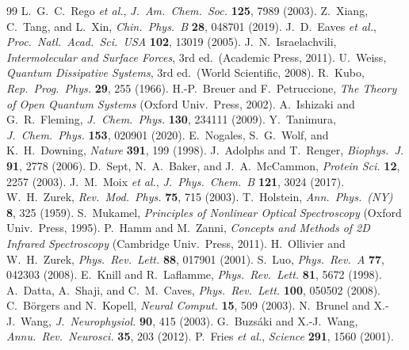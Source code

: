 \documentclass[twocolumn,10pt]{article}
\begin{document}
\begin{thebibliography}{99}
 L.~G.~C.~Rego \textit{et al.},
\textit{J.\ Am.\ Chem.\ Soc.} \textbf{125}, 7989 (2003).
 Z.~Xiang, C.~Tang, and L.~Xin,
\textit{Chin.\ Phys.\ B} \textbf{28}, 048701 (2019).
 J.~D.~Eaves \textit{et al.},
\textit{Proc.\ Natl.\ Acad.\ Sci.\ USA} \textbf{102}, 13019 (2005).
 J.~N.~Israelachvili, \textit{Intermolecular and
Surface Forces}, 3rd ed.\ (Academic Press, 2011).
 U.~Weiss, \textit{Quantum Dissipative Systems},
3rd ed.\ (World Scientific, 2008).
 R.~Kubo,
\textit{Rep.\ Prog.\ Phys.} \textbf{29}, 255 (1966).
 H.-P.~Breuer and F.~Petruccione,
\textit{The Theory of Open Quantum Systems} (Oxford Univ.\ Press, 2002).
 A.~Ishizaki and G.~R.~Fleming,
\textit{J.\ Chem.\ Phys.} \textbf{130}, 234111 (2009).
 Y.~Tanimura,
\textit{J.\ Chem.\ Phys.} \textbf{153}, 020901 (2020).
 E.~Nogales, S.~G.~Wolf, and K.~H.~Downing,
\textit{Nature} \textbf{391}, 199 (1998).
 J.~Adolphs and T.~Renger,
\textit{Biophys.\ J.} \textbf{91}, 2778 (2006).
 D.~Sept, N.~A.~Baker, and J.~A.~McCammon,
\textit{Protein Sci.} \textbf{12}, 2257 (2003).
 J.~M.~Moix \textit{et al.},
\textit{J.\ Phys.\ Chem.\ B} \textbf{121}, 3024 (2017).
 W.~H.~Zurek,
\textit{Rev.\ Mod.\ Phys.} \textbf{75}, 715 (2003).
 T.~Holstein,
\textit{Ann.\ Phys.\ (NY)} \textbf{8}, 325 (1959).
 S.~Mukamel, \textit{Principles of Nonlinear Optical
Spectroscopy} (Oxford Univ.\ Press, 1995).
 P.~Hamm and M.~Zanni, \textit{Concepts and Methods of
2D Infrared Spectroscopy} (Cambridge Univ.\ Press, 2011).
 H.~Ollivier and W.~H.~Zurek,
\textit{Phys.\ Rev.\ Lett.} \textbf{88}, 017901 (2001).
 S.~Luo,
\textit{Phys.\ Rev.\ A} \textbf{77}, 042303 (2008).
 E.~Knill and R.~Laflamme,
\textit{Phys.\ Rev.\ Lett.} \textbf{81}, 5672 (1998).
 A.~Datta, A.~Shaji, and C.~M.~Caves,
\textit{Phys.\ Rev.\ Lett.} \textbf{100}, 050502 (2008).
 C.~B\"orgers and N.~Kopell,
\textit{Neural Comput.} \textbf{15}, 509 (2003).
 N.~Brunel and X.-J.~Wang,
\textit{J.\ Neurophysiol.} \textbf{90}, 415 (2003).
 G.~Buzs\'aki and X.-J.~Wang,
\textit{Annu.\ Rev.\ Neurosci.} \textbf{35}, 203 (2012).
 P.~Fries \textit{et al.},
\textit{Science} \textbf{291}, 1560 (2001).

\end{thebibliography}
\end{document}
